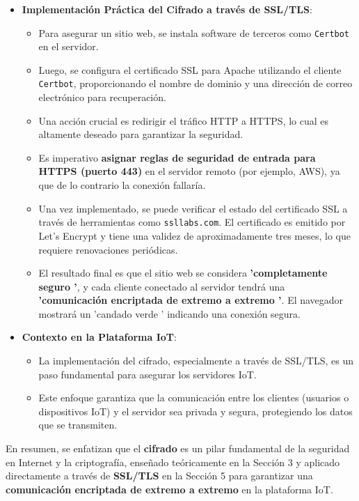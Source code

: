 \documentclass{report}
\begin{document}
\begin{itemize}
    \item \textbf{Implementación Práctica del Cifrado a través de SSL/TLS}:
    \begin{itemize}
        \item Para asegurar un sitio web, se instala software de terceros como \texttt{Certbot} en el servidor.
        \item Luego, se configura el certificado SSL para Apache utilizando el cliente \texttt{Certbot}, proporcionando el nombre de dominio y una 
        dirección de correo electrónico para recuperación.
        \item Una acción crucial es redirigir el tráfico HTTP a HTTPS, lo cual es altamente deseado para garantizar la seguridad.
        \item Es imperativo \textbf{asignar reglas de seguridad de entrada para HTTPS (puerto 443)} en el servidor remoto (por ejemplo, AWS), ya que 
        de lo contrario la conexión fallaría.
        \item Una vez implementado, se puede verificar el estado del certificado SSL a través de herramientas como \verb|ssllabs.com|. El certificado 
        es emitido por Let's Encrypt y tiene una validez de aproximadamente tres meses, lo que requiere renovaciones periódicas.
        \item El resultado final es que el sitio web se considera \textbf{ 'completamente seguro '}, y cada cliente conectado al servidor tendrá 
        una \textbf{ 'comunicación encriptada de extremo a extremo '}. El navegador mostrará un  'candado verde ' indicando una conexión segura.
    \end{itemize}

    \item \textbf{Contexto en la Plataforma IoT}:
    \begin{itemize}
        \item La implementación del cifrado, especialmente a través de SSL/TLS, es un paso fundamental para asegurar los servidores IoT.
        \item Este enfoque garantiza que la comunicación entre los clientes (usuarios o dispositivos IoT) y el servidor sea privada y segura, 
        protegiendo los datos que se transmiten.
    \end{itemize}
\end{itemize}
En resumen, se  enfatizan que el \textbf{cifrado} es un pilar fundamental de la seguridad en Internet y la criptografía, enseñado 
teóricamente en la Sección 3 y aplicado directamente a través de \textbf{SSL/TLS} en la Sección 5 para garantizar una \textbf{comunicación 
encriptada de extremo a extremo} en la plataforma IoT.
\end{document}
